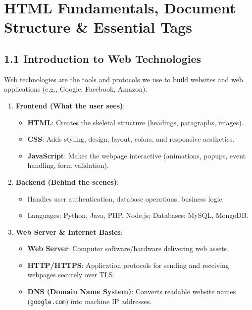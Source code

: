 \chapter{HTML Fundamentals, Document Structure \& Essential Tags}

\section{1.1 Introduction to Web Technologies}
Web technologies are the tools and protocols we use to build websites and web applications (e.g., Google, Facebook, Amazon).

\begin{summarybox}
\begin{enumerate}[leftmargin=*]
    \item \textbf{Frontend (What the user sees)}:
    \begin{itemize}
        \item \textbf{HTML}: Creates the skeletal structure (headings, paragraphs, images).
        \item \textbf{CSS}: Adds styling, design, layout, colors, and responsive aesthetics.
        \item \textbf{JavaScript}: Makes the webpage interactive (animations, popups, event handling, form validation).
    \end{itemize}
    \item \textbf{Backend (Behind the scenes)}:
    \begin{itemize}
        \item Handles user authentication, database operations, business logic.
        \item Languages: Python, Java, PHP, Node.js; Databases: MySQL, MongoDB.
    \end{itemize}
    \item \textbf{Web Server \& Internet Basics}:
    \begin{itemize}
        \item \textbf{Web Server}: Computer software/hardware delivering web assets.
        \item \textbf{HTTP/HTTPS}: Application protocols for sending and receiving webpages securely over TLS.
        \item \textbf{DNS (Domain Name System)}: Converts readable website names (\texttt{google.com}) into machine IP addresses.
    \end{itemize}
\end{enumerate}
\end{summarybox}

